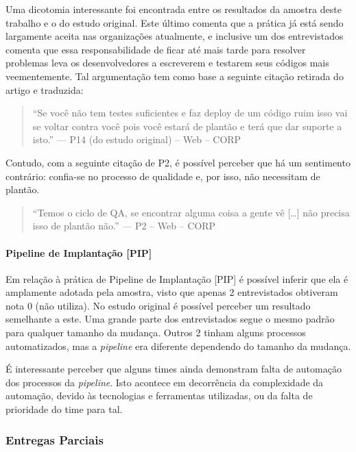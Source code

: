 Uma dicotomia interessante foi encontrada entre os resultados da amostra deste trabalho e o do estudo original. Este último comenta que a prática já está sendo largamente aceita nas organizações atualmente, e inclusive um dos entrevistados comenta que essa responsabilidade de ficar até mais tarde para resolver problemas leva os desenvolvedores a escreverem e testarem seus códigos mais veementemente. Tal argumentação tem como base a seguinte citação retirada do artigo e traduzida:

\begin{quote}
    ``Se você não tem testes suficientes e faz deploy de um código ruim isso vai se voltar contra você pois você estará de plantão e terá que dar suporte a isto.'' --- P14 (do estudo original) -- Web -- CORP
\end{quote}


Contudo, com a seguinte citação de P2, é possível perceber que há um sentimento contrário: confia-se no processo de qualidade e, por isso, não necessitam de plantão.


\begin{quote}
    ``Temos o ciclo de QA, se encontrar alguma coisa a gente vê […] não precisa isso de plantão não.'' --- P2 -- Web -- CORP
\end{quote}

\paragraph{Pipeline de Implantação [PIP]}

Em relação à prática de Pipeline de Implantação [PIP] \cite{devopsBook} é possível inferir que ela é amplamente adotada pela amostra, visto que apenas 2 entrevistados obtiveram nota 0 (não utiliza). No estudo original é possível perceber um resultado semelhante a este. Uma grande parte dos entrevistados segue o mesmo padrão para qualquer tamanho da mudança. Outros 2 tinham alguns processos automatizados, mas a \emph{pipeline} era diferente dependendo do tamanho da mudança.

É interessante perceber que alguns times ainda demonstram falta de automação dos processos da \emph{pipeline}. Isto acontece em decorrência da complexidade da automação, devido às tecnologias e ferramentas utilizadas, ou da falta de prioridade do time para tal.
 
\subsubsection{Entregas Parciais}

